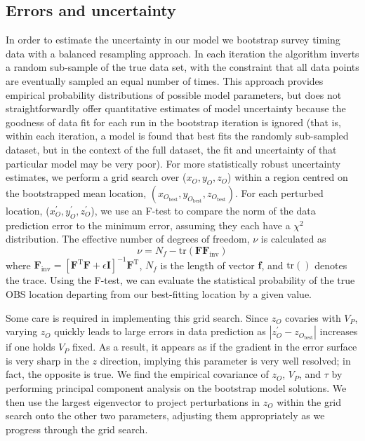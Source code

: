 \subsection{Errors and uncertainty}
In order to estimate the uncertainty in our model we bootstrap survey timing data with a balanced resampling approach. In each iteration the algorithm inverts a random sub-sample of the true data set, with the constraint that all data points are eventually sampled an equal number of times. This approach provides empirical probability distributions of possible model parameters, but does not straightforwardly offer quantitative estimates of model uncertainty because the goodness of data fit for each run in the bootstrap iteration is ignored (that is, within each iteration, a model is found that best fits the randomly sub-sampled dataset, but in the context of the full dataset, the fit and uncertainty of that particular model may be very poor). For more statistically robust uncertainty estimates, we perform a grid search over ($x_O,y_O,z_O$) within a region centred on the bootstrapped mean location, 
$(x_{O_{\text{best}}},y_{O_{\text{best}}},z_{O_{\text{best}}})$. For each perturbed location, ($x_O^{\prime},y_O^{\prime},z_O^{\prime}$), we use an F-test to compare the norm of the data prediction error to the minimum error, assuming they each have a $\chi^2$ distribution. The effective number of degrees of freedom, $\nu$ is calculated as 
\begin{equation}
\nu = N_f - \text{tr}(\mathbf{F}\mathbf{F}_{\text{inv}})
\end{equation}
where $\mathbf{F}_{\text{inv}}= \left[ \mathbf{F}^{\text{T}} \mathbf{F} + \epsilon\mathbf{I} \right]^{-1} \mathbf{F}^{\text{T}}$, $N_f$ is the length of vector $\mathbf{f}$, and $\text{tr}()$ denotes the trace. Using the F-test, we can evaluate the statistical probability of the true OBS location departing from our best-fitting location by a given value. 

Some care is required in implementing this grid search. Since $z_O$ covaries with $V_P$, varying $z_O$ quickly leads to large errors in data prediction as $|z_O^{\prime}-z_{O_{\text{best}}}|$ increases if one holds $V_P$ fixed. As a result, it appears as if the gradient in the error surface is very sharp in the $z$ direction, implying this parameter is very well resolved; in fact, the opposite is true. We find the empirical covariance of $z_O$, $V_P$, and $\tau$ by performing principal component analysis on the bootstrap model solutions. We then use the largest eigenvector to project perturbations in $z_O$ within the grid search onto the other two parameters, adjusting them appropriately as we progress through the grid search. 

